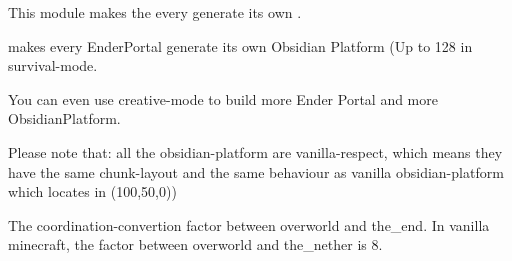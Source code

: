 
This module makes the every  generate its own .

makes every EnderPortal generate its own Obsidian Platform (Up to 128 in survival-mode.

You can even use creative-mode to build more Ender Portal and more ObsidianPlatform.

Please note that: all the obsidian-platform are vanilla-respect, which means they have the same chunk-layout and the same behaviour as vanilla obsidian-platform which locates in (100,50,0))

The coordination-convertion factor between overworld and the\_end.
In vanilla minecraft, the factor between overworld and the\_nether is 8.